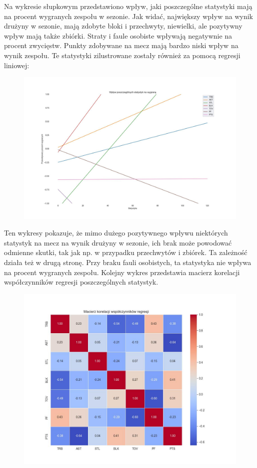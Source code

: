 \documentclass{article}
\begin{document}
Na wykresie słupkowym przedstawiono wpływ, jaki poszczególne statystyki mają na procent wygranych zespołu w sezonie. Jak widać, największy wpływ na wynik drużyny w sezonie, mają zdobyte bloki i przechwyty, niewielki, ale pozytywny wpływ mają także zbiórki. Straty i faule osobiste wpływają negatywnie na procent zwycięstw. Punkty zdobywane na mecz mają bardzo niski wpływ na wynik zespołu.
\newpage
Te statystyki zilustrowane zostały również za pomocą regresji liniowej:

\begin{figure}[htp]
    \centering
    \includegraphics[width=16cm]{reg_analiza.jpg}
    \label{fig:reg_analiza}
\end{figure}

Ten wykresy pokazuje, że mimo dużego pozytywnego wpływu niektórych statystyk na mecz na wynik drużyny w sezonie, ich brak może powodować odmienne skutki, tak jak np. w przypadku przechwytów i zbiórek. Ta zależność działa też w drugą stronę. Przy braku fauli osobistych, ta statystyka nie wpływa na procent wygranych zespołu.
\newpage
Kolejny wykres przedstawia macierz korelacji współczynników regresji poszczególnych statystyk.

\begin{figure}[htp]
    \centering
    \includegraphics[width=16cm]{corr.jpg}
    \label{fig:corr}
\end{figure}
\end{document}
